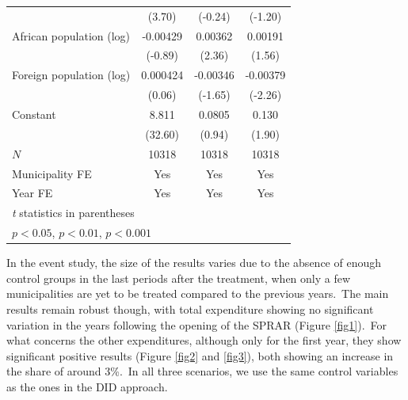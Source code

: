\documentclass[authoryear,preprint,review,12pt]{elsarticle}
\begin{document}
\begin{table}[H]
{\begin{tabular}{l*{3}{c}}
            &      (3.70)         &     (-0.24)         &     (-1.20)         \\
[1em]
African population (log)&    -0.00429         &     0.00362\sym{*}  &     0.00191         \\
            &     (-0.89)         &      (2.36)         &      (1.56)         \\
[1em]
Foreign population (log)&    0.000424         &    -0.00346         &    -0.00379\sym{*}  \\
            &      (0.06)         &     (-1.65)         &     (-2.26)         \\
[1em]
Constant      &       8.811\sym{***}&      0.0805         &       0.130         \\
            &     (32.60)         &      (0.94)         &      (1.90)         \\
\hline
\(N\)       &       10318         &       10318         &       10318         \\
\hline\hline
Municipality FE & Yes & Yes & Yes \\
Year FE & Yes & Yes & Yes \\ 
\hline\hline
\multicolumn{4}{l}{\footnotesize \textit{t} statistics in parentheses}\\
\multicolumn{4}{l}{\footnotesize \sym{*} \(p<0.05\), \sym{**} \(p<0.01\), \sym{***} \(p<0.001\)}\\
\end{tabular}
}

    \label{tab1}
\end{table}

\noindent
In the event study, the size of the results varies due to the absence of enough control groups in the last periods after the treatment, when only a few municipalities are yet to be treated compared to the previous years.\ The main results remain robust though, with total expenditure showing no significant variation in the years following the opening of the SPRAR (Figure \ref{fig1}).\ For what concerns the other expenditures, although only for the first year, they show significant positive results (Figure \ref{fig2} and \ref{fig3}), both showing an increase in the share of around 3\%.\ In all three scenarios, we use the same control variables as the ones in the DID approach.\\ 
\end{document}
